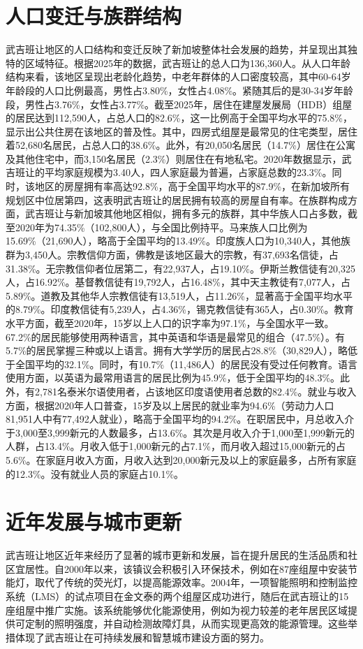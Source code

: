 \documentclass[11pt,a4paper,twoside,openany]{book}
\begin{document}
\section{人口变迁与族群结构}
武吉班让地区的人口结构和变迁反映了新加坡整体社会发展的趋势，并呈现出其独特的区域特征。根据2025年的数据，武吉班让的总人口为136,360人。从人口年龄结构来看，该地区呈现出老龄化趋势，中老年群体的人口密度较高，其中60-64岁年龄段的人口比例最高，男性占3.80\%，女性占4.08\%。紧随其后的是30-34岁年龄段，男性占3.76\%，女性占3.77\%。截至2025年，居住在建屋发展局（HDB）组屋的居民达到112,590人，占总人口的82.6\%，这一比例高于全国平均水平的75.8\%，显示出公共住房在该地区的普及性。其中，四房式组屋是最常见的住宅类型，居住着52,680名居民，占总人口的38.6\%。此外，有20,050名居民（14.7\%）居住在公寓及其他住宅中，而3,150名居民（2.3\%）则居住在有地私宅。2020年数据显示，武吉班让的平均家庭规模为3.40人，四人家庭最为普遍，占家庭总数的23.3\%。同时，该地区的房屋拥有率高达92.8\%，高于全国平均水平的87.9\%，在新加坡所有规划区中位居第四，这表明武吉班让的居民拥有较高的房屋自有率。在族群构成方面，武吉班让与新加坡其他地区相似，拥有多元的族群，其中华族人口占多数，截至2020年为74.35\%（102,800人），与全国比例持平。马来族人口比例为15.69\%（21,690人），略高于全国平均的13.49\%。印度族人口为10,340人，其他族群为3,450人。宗教信仰方面，佛教是该地区最大的宗教，有37,693名信徒，占31.38\%。无宗教信仰者位居第二，有22,937人，占19.10\%。伊斯兰教信徒有20,325人，占16.92\%。基督教信徒有19,792人，占16.48\%，其中天主教徒有7,077人，占5.89\%。道教及其他华人宗教信徒有13,519人，占11.26\%，显著高于全国平均水平的8.79\%。印度教信徒有5,239人，占4.36\%，锡克教信徒有365人，占0.30\%。教育水平方面，截至2020年，15岁以上人口的识字率为97.1\%，与全国水平一致。67.2\%的居民能够使用两种语言，其中英语和华语是最常见的组合（47.5\%）。有5.7\%的居民掌握三种或以上语言。拥有大学学历的居民占28.8\%（30,829人），略低于全国平均的32.1\%。同时，有10.7\%（11,486人）的居民没有受过任何教育。语言使用方面，以英语为最常用语言的居民比例为45.9\%，低于全国平均的48.3\%。此外，有2,781名泰米尔语使用者，占该地区印度语使用者总数的82.4\%。就业与收入方面，根据2020年人口普查，15岁及以上居民的就业率为94.6\%（劳动力人口81,951人中有77,492人就业），略高于全国平均的94.2\%。在职居民中，月总收入介于3,000至3,999新元的人数最多，占13.6\%。其次是月收入介于1,000至1,999新元的人群，占13.4\%。月收入低于1,000新元的占7.1\%，而月收入超过15,000新元的占5.6\%。在家庭月收入方面，月收入达到20,000新元及以上的家庭最多，占所有家庭的12.3\%。没有就业人员的家庭占10.1\%。

\section{近年发展与城市更新}
武吉班让地区近年来经历了显著的城市更新和发展，旨在提升居民的生活品质和社区宜居性。自2000年以来，该镇议会积极引入环保技术，例如在87座组屋中安装节能灯，取代了传统的荧光灯，以提高能源效率。2004年，一项智能照明和控制监控系统（LMS）的试点项目在金文泰的两个组屋区成功进行，随后在武吉班让的15座组屋中推广实施。该系统能够优化能源使用，例如为视力较差的老年居民区域提供可定制的照明强度，并自动检测故障灯具，从而实现更高效的能源管理。这些举措体现了武吉班让在可持续发展和智慧城市建设方面的努力。
\end{document}
